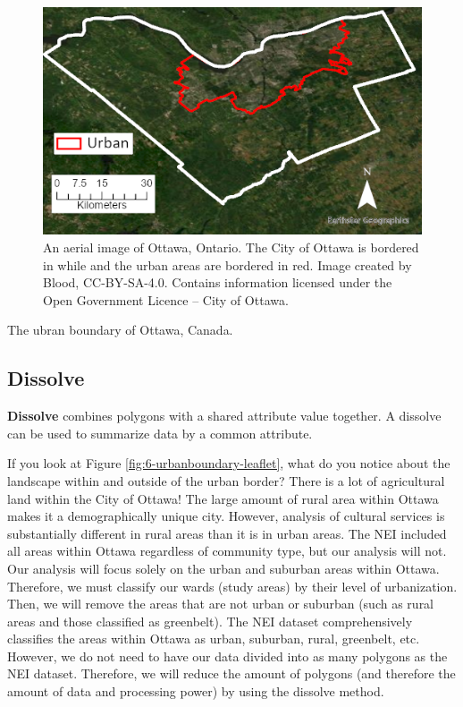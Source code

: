 \documentclass[
]{book}
\begin{document}
\begin{figure}
\includegraphics[width=0.75\linewidth]{images/06-urbanOttawa} \caption{An aerial image of Ottawa, Ontario. The City of Ottawa is bordered in while and the urban areas are bordered in red. Image created by Blood, CC-BY-SA-4.0. Contains information licensed under the Open Government Licence – City of Ottawa.}\label{fig:6-ottawa-urb}
\end{figure}

\label{fig:6-display-leaflet}The ubran boundary of Ottawa, Canada.

\hypertarget{dissolve}{%
\subsection{Dissolve}\label{dissolve}}

\textbf{Dissolve} combines polygons with a shared attribute value together. A dissolve can be used to summarize data by a common attribute.

If you look at Figure \ref{fig:6-urbanboundary-leaflet}, what do you notice about the landscape within and outside of the urban border? There is a lot of agricultural land within the City of Ottawa! The large amount of rural area within Ottawa makes it a demographically unique city. However, analysis of cultural services is substantially different in rural areas than it is in urban areas. The NEI included all areas within Ottawa regardless of community type, but our analysis will not. Our analysis will focus solely on the urban and suburban areas within Ottawa. Therefore, we must classify our wards (study areas) by their level of urbanization. Then, we will remove the areas that are not urban or suburban (such as rural areas and those classified as greenbelt). The NEI dataset comprehensively classifies the areas within Ottawa as urban, suburban, rural, greenbelt, etc. However, we do not need to have our data divided into as many polygons as the NEI dataset. Therefore, we will reduce the amount of polygons (and therefore the amount of data and processing power) by using the dissolve method.
\end{document}
